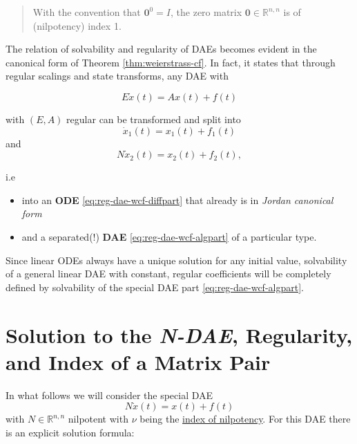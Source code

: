 \documentclass[]{book}
\providecommand{\tightlist}{%
  \setlength{\itemsep}{0pt}\setlength{\parskip}{0pt}}
\newenvironment {JHSAYS} [0] {\begin{quote}\color{jhsc}} {\end{quote}}
\theoremstyle{definition}
\theoremstyle{definition}
\theoremstyle{definition}
\theoremstyle{definition}
\theoremstyle{remark}
\begin{document}
\begin{JHSAYS}
With the convention that \(\mathbf 0^0=I\), the zero matrix
\(\mathbf 0 \in \mathbb R^{n,n}\) is of (nilpotency) index 1.
\end{JHSAYS}

The relation of solvability and regularity of DAEs becomes evident in the canonical form of Theorem \ref{thm:weierstrass-cf}. In fact, it states that through regular scalings and state transforms, any DAE with

\[
E\dot x(t) =  A x(t) + f(t)
\]

with \((E,A)\) regular can be transformed and split into
\begin{equation}
\dot x_1(t) = x_1(t) + f_1(t) \label{eq:reg-dae-wcf-diffpart}
\end{equation}
and
\begin{equation}
N \dot x_2(t) = x_2(t) + f_2(t) \label{eq:reg-dae-wcf-algpart},
\end{equation}

i.e

\begin{itemize}
\tightlist
\item
  into an \textbf{ODE} \eqref{eq:reg-dae-wcf-diffpart} that already is in \emph{Jordan canonical form}
\item
  and a separated(!) \textbf{DAE} \eqref{eq:reg-dae-wcf-algpart} of a particular type.
\end{itemize}

Since linear ODEs always have a unique solution for any initial value, solvability of a general linear DAE with constant, regular coefficients will be completely defined by solvability of the special DAE part \eqref{eq:reg-dae-wcf-algpart}.

\hypertarget{solution-to-the-n-dae-regularity-and-index-of-a-matrix-pair}{%
\section{\texorpdfstring{Solution to the \emph{N-DAE}, Regularity, and Index of a Matrix Pair}{Solution to the N-DAE, Regularity, and Index of a Matrix Pair}}\label{solution-to-the-n-dae-regularity-and-index-of-a-matrix-pair}}

In what follows we will consider the special DAE
\begin{equation}
N \dot x(t) = x(t) + f(t) \label{eq:ndae}
\end{equation}
with \(N \in \mathbb R^{n,n}\) nilpotent with \(\nu\) being the \protect\hyperlink{def:nilpotent-matrix}{index of nilpotency}.
For this DAE there is an explicit solution formula:
\end{document}

